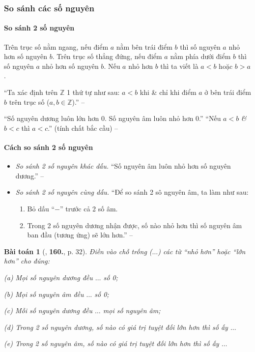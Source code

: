 \documentclass{article}
\numberwithin{equation}{section}
\newtheorem{baitoan}{Bài toán}[section]
\begin{document}
\subsubsection{So sánh các số nguyên}

\paragraph{So sánh 2 số nguyên}
\begin{tcolorbox}
	Trên trục số nằm ngang, nếu điểm $a$ nằm bên trái điểm $b$ thì số nguyên $a$ nhỏ hơn số nguyên $b$. Trên trục số thẳng đứng, nếu điểm $a$ nằm phía dưới điểm $b$ thì số nguyên $a$ nhỏ hơn số nguyên $b$. Nếu $a$ nhỏ hơn $b$ thì ta viết là $a < b$ hoặc $b > a$.
\end{tcolorbox}
``Ta xác định trên $\mathbb{Z}$ 1 thứ tự như sau: $a < b$ khi \& chỉ khi điểm $a$ ở bên trái điểm $b$ trên trục số ($a,b\in\mathbb{Z}$).'' -- \cite[Chương 2, p. 32]{Binh_Toan_6_tap_1}

``Số nguyên dương luôn lớn hơn 0. Số nguyên âm luôn nhỏ hơn 0.'' ``Nếu $a < b$ \textit{\&} $b < c$ thì $a < c$.'' (tính chất bắc cầu) -- \cite[p. 67]{SGK_Toan_6_Canh_Dieu_tap_1}

\paragraph{Cách so sánh 2 số nguyên}
\begin{itemize}
	\item \textit{So sánh 2 số nguyên khác dấu.} ``Số nguyên âm luôn nhỏ hơn số nguyên dương.'' -- \cite[p. 68]{SGK_Toan_6_Canh_Dieu_tap_1}
	\item \textit{So sánh 2 số nguyên cùng dấu.} ``Để so sánh 2 sô nguyên âm, ta làm như sau:
	\begin{enumerate}
		\item Bỏ dấu ``$-$'' trước cả 2 số âm.
		\item Trong 2 số nguyên dương nhận được, số nào nhỏ hơn thì số nguyên âm ban đầu (tương ứng) sẽ lớn hơn.'' -- \cite[p. 69]{SGK_Toan_6_Canh_Dieu_tap_1}
	\end{enumerate}
\end{itemize}

\begin{baitoan}[\cite{Binh_Toan_6_tap_1}, \textbf{160.}, p. 32]
	Điền vào chỗ trống ($\ldots$) các từ ``nhỏ hơn'' hoặc ``lớn hơn'' cho đúng:
	\begin{enumerate*}
		\item[(a)] Mọi số nguyên dương đều $\ldots$ số 0;
		\item[(b)] Mọi số nguyên âm đều $\ldots$ số 0;
		\item[(c)] Mỗi số nguyên dương đều $\ldots$ mọi số nguyên âm;
		\item[(d)] Trong 2 số nguyên dương, số nào có giá trị tuyệt đối lớn hơn thì số ấy $\ldots$
		\item[(e)] Trong 2 số nguyên âm, số nào có giá trị tuyệt đối lớn hơn thì số ấy $\ldots$
	\end{enumerate*}
\end{baitoan}
\end{document}
